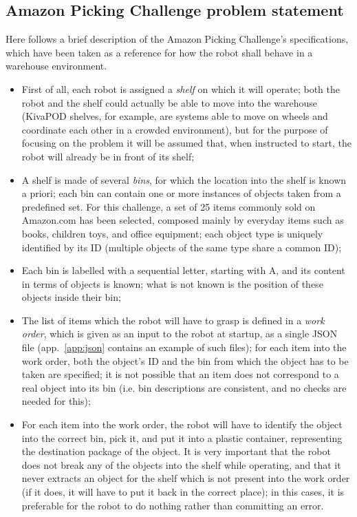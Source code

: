 \subsection{Amazon Picking Challenge problem statement} \label{sec:apc-problem}
Here follows a brief description of the Amazon Picking Challenge's
specifications, which have been taken as a reference for how the robot
shall behave in a warehouse environment.

\begin{itemize}

\item{First of all, each robot is assigned a \emph{shelf} on which it will
operate; both the robot and the shelf could actually be able to move
into the warehouse (KivaPOD shelves, for example, are systems able to
move on wheels and coordinate each other in a crowded environment),
but for the purpose of focusing on the problem it will be assumed
that, when instructed to start, the robot will already be in front of
its shelf;}
\item{A shelf is made of several \emph{bins}, for which the location
into the shelf is known a priori; each bin can contain one or more
instances of objects taken from a predefined set. For this challenge,
a set of 25 items commonly sold on Amazon.com has been selected,
composed mainly by everyday items such as books, children toys, and
office equipment; each object type is uniquely identified by its ID
(multiple objects of the same type share a common ID);}
\item{Each bin is labelled with a sequential letter, starting with A,
and its content in terms of objects is known; what is not known is the
position of these objects inside their bin;}
\item{The list of items which the robot will have to grasp is defined
in a \emph{work order}, which is given as an input to the robot at
startup, as a single JSON file (app.~\ref{app:json} contains an
example of such files); for each item into the work order, both the object's ID and
the bin from which the object has to be taken are specified; it is not
possible that an item does not correspond to a real object into its
bin (i.e. bin descriptions are consistent, and no checks are needed
for this);}
\item{For each item into the work order, the robot will have to
identify the object into the correct bin, pick it, and put it into a
plastic container, representing the destination package of the
object. It is very important that the robot does not break any of the
objects into the shelf while operating, and that it never extracts an
object for the shelf which is not present into the work order (if it
does, it will have to put it back in the correct place); in this
cases, it is preferable for the robot to do nothing rather than
committing an error.}
\end{itemize}


